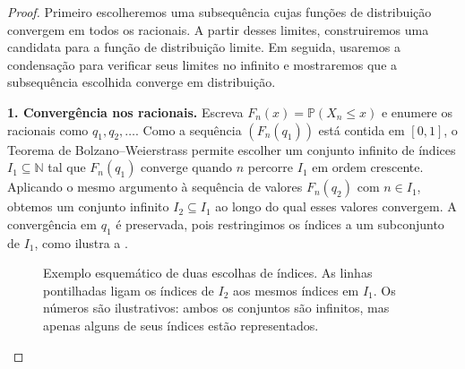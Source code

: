 \documentclass[12pt,portuguese]{article}
\theoremstyle{definition}
\theoremstyle{plainexercise}
\theoremstyle{starredexercise}
\theoremstyle{definition}
\begin{document}
\begin{proof}
Primeiro escolheremos uma subsequência cujas funções de distribuição
convergem em todos os racionais. A partir desses limites, construiremos uma
candidata para a função de distribuição limite. Em seguida, usaremos a
condensação para verificar seus limites no infinito e mostraremos que a
subsequência escolhida converge em distribuição.

\smallskip
\noindent\textbf{1. Convergência nos racionais.}
Escreva $F_n(x)=\mathbb{P}(X_n\leqslant x)$ e enumere os racionais como
$q_1,q_2,\ldots$. Como a sequência $(F_n(q_1))$ está contida em $[0,1]$, o
Teorema de Bolzano--Weierstrass permite escolher um conjunto infinito de
índices $I_1\subseteq\mathbb{N}$ tal que $F_n(q_1)$ converge quando $n$
percorre $I_1$ em ordem crescente. Aplicando o mesmo argumento à sequência
de valores $F_n(q_2)$ com $n\in I_1$, obtemos um conjunto infinito
$I_2\subseteq I_1$ ao longo do qual esses valores convergem. A convergência
em $q_1$ é preservada, pois restringimos os índices a um subconjunto de $I_1$,
como ilustra a .

\begin{figure}[H]
\centering
{}
\caption{Exemplo esquemático de duas escolhas de índices. As linhas
pontilhadas ligam os índices de $I_2$ aos mesmos índices em $I_1$. Os números
são ilustrativos: ambos os conjuntos são infinitos, mas apenas alguns de seus
índices estão representados.}
\label{fig:selecao-indices-racionais}
\end{figure}


\end{proof}
\end{document}
